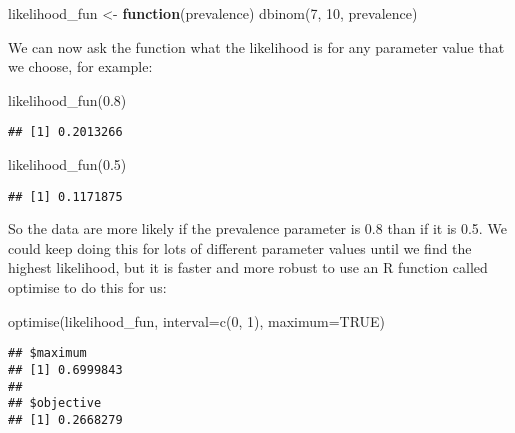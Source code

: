 \documentclass[
  12pt,
]{article}
\newenvironment{Shaded}{\begin{snugshade}}{\end{snugshade}}
\newcommand{\AttributeTok}[1]{\textcolor[rgb]{0.77,0.63,0.00}{#1}}
\newcommand{\ConstantTok}[1]{\textcolor[rgb]{0.00,0.00,0.00}{#1}}
\newcommand{\ControlFlowTok}[1]{\textcolor[rgb]{0.13,0.29,0.53}{\textbf{#1}}}
\newcommand{\DecValTok}[1]{\textcolor[rgb]{0.00,0.00,0.81}{#1}}
\newcommand{\FloatTok}[1]{\textcolor[rgb]{0.00,0.00,0.81}{#1}}
\newcommand{\FunctionTok}[1]{\textcolor[rgb]{0.00,0.00,0.00}{#1}}
\newcommand{\NormalTok}[1]{#1}
\newcommand{\OtherTok}[1]{\textcolor[rgb]{0.56,0.35,0.01}{#1}}
\begin{document}
\begin{Shaded}
\begin{Highlighting}[]
\NormalTok{likelihood\_fun }\OtherTok{\textless{}{-}} \ControlFlowTok{function}\NormalTok{(prevalence) }\FunctionTok{dbinom}\NormalTok{(}\DecValTok{7}\NormalTok{, }\DecValTok{10}\NormalTok{, prevalence)}
\end{Highlighting}
\end{Shaded}

We can now ask the function what the likelihood is for any parameter
value that we choose, for example:

\begin{Shaded}
\begin{Highlighting}[]
\FunctionTok{likelihood\_fun}\NormalTok{(}\FloatTok{0.8}\NormalTok{)}
\end{Highlighting}
\end{Shaded}

\begin{verbatim}
## [1] 0.2013266
\end{verbatim}

\begin{Shaded}
\begin{Highlighting}[]
\FunctionTok{likelihood\_fun}\NormalTok{(}\FloatTok{0.5}\NormalTok{)}
\end{Highlighting}
\end{Shaded}

\begin{verbatim}
## [1] 0.1171875
\end{verbatim}

So the data are more likely if the prevalence parameter is 0.8 than if
it is 0.5. We could keep doing this for lots of different parameter
values until we find the highest likelihood, but it is faster and more
robust to use an R function called optimise to do this for us:

\begin{Shaded}
\begin{Highlighting}[]
\FunctionTok{optimise}\NormalTok{(likelihood\_fun, }\AttributeTok{interval=}\FunctionTok{c}\NormalTok{(}\DecValTok{0}\NormalTok{, }\DecValTok{1}\NormalTok{), }\AttributeTok{maximum=}\ConstantTok{TRUE}\NormalTok{)}
\end{Highlighting}
\end{Shaded}

\begin{verbatim}
## $maximum
## [1] 0.6999843
## 
## $objective
## [1] 0.2668279
\end{verbatim}
\end{document}

